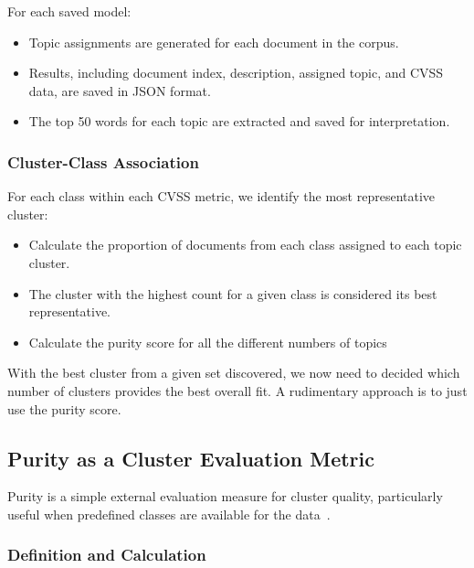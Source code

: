 \documentclass[12pt]{article}
\begin{document}
For each saved model:

\begin{itemize}

	\item Topic assignments are generated for each document in the corpus.

	\item Results, including document index, description, assigned topic, and CVSS data, are saved
	      in JSON format.

	\item The top 50 words for each topic are extracted and saved for interpretation.

\end{itemize}


\subsubsection{Cluster-Class Association}

For each class within each CVSS metric, we identify the most representative cluster:

\begin{itemize}

	\item Calculate the proportion of documents from each class assigned to each topic cluster.

	\item The cluster with the highest count for a given class is considered its best representative.

	\item Calculate the purity score for all the different numbers of topics

\end{itemize}

With the best cluster from a given set discovered, we now need to decided which number of clusters
provides the best overall fit. A rudimentary approach is to just use the purity score.

\subsection{Purity as a Cluster Evaluation Metric}\label{sec:purity}

Purity is a simple external evaluation measure for cluster quality, particularly useful when
predefined classes are available for the data~\cite{purity_usuage}.

\subsubsection{Definition and Calculation}
\end{document}
